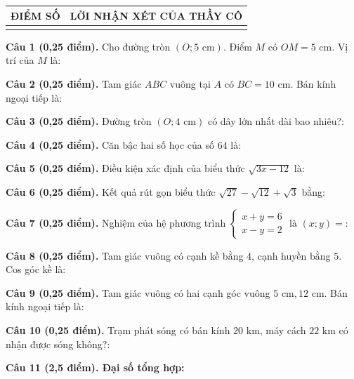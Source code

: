 \documentclass[12pt,a4paper]{article}
\begin{document}
\vspace{1.0mm}

\noindent
\begin{tabularx}{\linewidth}{|p{3.2cm}|X|}
\hline
\centering\textbf{ĐIỂM SỐ} & \centering\textbf{LỜI NHẬN XÉT CỦA THẦY CÔ} \tabularnewline
\hline
\rule{0pt}{1.8cm} & \tabularnewline
\hline
\end{tabularx}

\vspace{1.2mm}
\noindent\textbf{Câu 1 (0,25 điểm).} Cho đường tròn $(O; 5\text{ cm})$. Điểm $M$ có $OM = 5\text{ cm}$. Vị trí của $M$ là: \par\vspace{0.6mm}
\noindent\textbf{Câu 2 (0,25 điểm).} Tam giác $ABC$ vuông tại $A$ có $BC = 10\text{ cm}$. Bán kính ngoại tiếp là: \par\vspace{0.6mm}
\noindent\textbf{Câu 3 (0,25 điểm).} Đường tròn $(O; 4\text{ cm})$ có dây lớn nhất dài bao nhiêu?: \par\vspace{0.6mm}
\noindent\textbf{Câu 4 (0,25 điểm).} Căn bậc hai số học của số $64$ là: \par\vspace{0.6mm}
\noindent\textbf{Câu 5 (0,25 điểm).} Điều kiện xác định của biểu thức $\sqrt{3x - 12}$ là: \par\vspace{0.6mm}
\noindent\textbf{Câu 6 (0,25 điểm).} Kết quả rút gọn biểu thức $\sqrt{27} - \sqrt{12} + \sqrt{3}$ bằng: \par\vspace{0.6mm}
\noindent\textbf{Câu 7 (0,25 điểm).} Nghiệm của hệ phương trình $\begin{cases} x + y = 6 \\ x - y = 2 \end{cases}$ là $(x; y) = $: \par\vspace{0.6mm}
\noindent\textbf{Câu 8 (0,25 điểm).} Tam giác vuông có cạnh kề bằng $4$, cạnh huyền bằng $5$. Cos góc kề là: \par\vspace{0.6mm}
\noindent\textbf{Câu 9 (0,25 điểm).} Tam giác vuông có hai cạnh góc vuông $5\text{ cm}, 12\text{ cm}$. Bán kính ngoại tiếp là: \par\vspace{0.6mm}
\noindent\textbf{Câu 10 (0,25 điểm).} Trạm phát sóng có bán kính $20\text{ km}$, máy cách $22\text{ km}$ có nhận được sóng không?: \par\vspace{0.6mm}
\vspace{0.8mm}
\noindent\textbf{Câu 11 (2,5 điểm). Đại số tổng hợp:}
\vspace{0.6mm}
\end{document}
